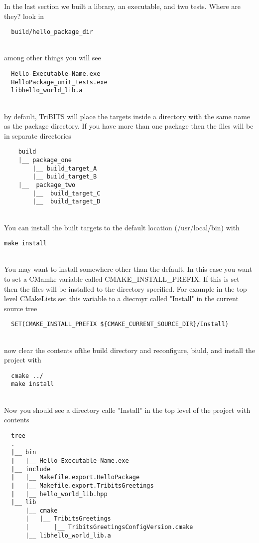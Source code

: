 \documentclass[12pt]{article}
\begin{document}
In the last section we built a library, an executable, and two tests.
Where are they? look in

\begin{verbatim}
  build/hello_package_dir
\end{verbatim}\\
among other things you will see
  
\begin{verbatim}
  Hello-Executable-Name.exe
  HelloPackage_unit_tests.exe
  libhello_world_lib.a
\end{verbatim}\\
by default, TriBITS will place the targets inside a directory with the
same name as the package directory.  If you have more than one package
then the files will be in separate directories

\begin{verbatim}
    build
    |__ package_one
        |__ build_target_A
        |__ build_target_B
    |__  package_two
        |__  build_target_C
        |__  build_target_D
\end{verbatim}\\
You can install the built targets to the default location
(/usr/local/bin) with

\begin{verbatim}
make install
\end{verbatim}\\
You may want to install somewhere other than the default.  In this
case you want to set a CMamke variable called CMAKE\_INSTALL\_PREFIX. If
this is set then the files will be installed to the directory
specified.  For example in the top level CMakeLists set this variable
to a diecroyr called "Install" in the current source tree

\begin{verbatim}
  SET(CMAKE_INSTALL_PREFIX ${CMAKE_CURRENT_SOURCE_DIR}/Install)
\end{verbatim}\\
now clear the contents ofthe build directory and reconfigure, biuld,
and install the project with

\begin{verbatim}
  cmake ../
  make install
\end{verbatim}\\
Now you should see a directory calle "Install" in the top level of the
project with contents

\begin{verbatim}
  tree
  .
  |__ bin
  |   |__ Hello-Executable-Name.exe
  |__ include
  |   |__ Makefile.export.HelloPackage
  |   |__ Makefile.export.TribitsGreetings
  |   |__ hello_world_lib.hpp
  |__ lib
      |__ cmake
      |   |__ TribitsGreetings
      |       |__ TribitsGreetingsConfigVersion.cmake
      |__ libhello_world_lib.a
\end{verbatim}\\
\end{document}

